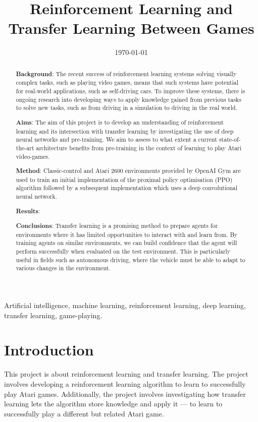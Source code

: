 \documentclass[12pt,a4paper]{article}
\title{Reinforcement Learning and \\ Transfer Learning Between Games}
\author{} %
\date{\today}
\begin{document}
\maketitle

\begin{abstract}
{\bf Background}: The recent success of reinforcement learning systems solving visually complex tasks, such as playing video games, means that such systems have potential for real-world applications, such as self-driving cars. To improve these systems, there is ongoing research into developing ways to apply knowledge gained from previous tasks to solve new tasks, such as from driving in a simulation to driving in the real world.

{\bf Aims}: The aim of this project is to develop an understanding of reinforcement learning and its intersection with transfer learning by investigating the use of deep neural networks and pre-training. We aim to assess to what extent a current state-of-the-art architecture benefits from pre-training in the context of learning to play Atari video-games.

{\bf Method}: Classic-control and Atari 2600 environments provided by OpenAI Gym are used to train an initial implementation of the proximal policy optimisation (PPO) algorithm followed by a subsequent implementation which uses a deep convolutional neural network.

{\bf Results}: 

{\bf Conclusions}: Transfer learning is a promising method to prepare agents for environments where it has limited opportunities to interact with and learn from. By training agents on similar environments, we can build confidence that the agent will perform successfully when evaluated on the test environment. This is particularly useful in fields such as autonomous driving, where the vehicle must be able to adapt to various changes in the environment.
\end{abstract}

\begin{keywords}
Artificial intelligence, machine learning, reinforcement learning, deep learning, transfer learning, game-playing.
\end{keywords}

\newpage
\section{Introduction}
This project is about reinforcement learning and transfer learning. The project involves developing a reinforcement learning algorithm to learn to successfully play Atari games. Additionally, the project involves investigating how transfer learning lets the algorithm store knowledge and apply it --- to learn to successfully play a different but related Atari game.  
\end{document}
